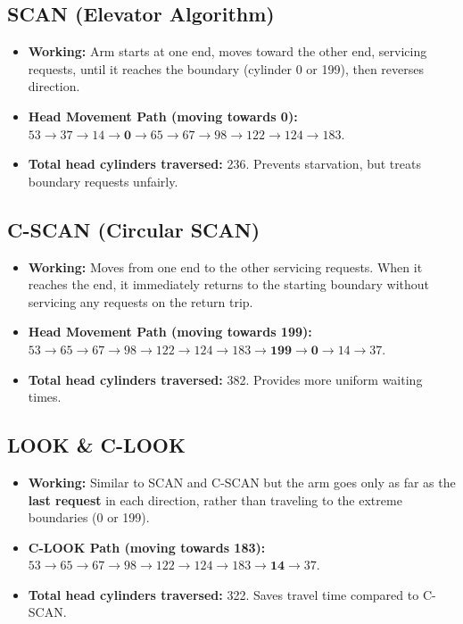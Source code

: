 \documentclass[12pt,a4paper]{article}
\begin{document}
\subsection{SCAN (Elevator Algorithm)}
\begin{itemize}[leftmargin=*, itemsep=3pt]
  \item \textbf{Working:} Arm starts at one end, moves toward the other end, servicing requests, until it reaches the boundary (cylinder 0 or 199), then reverses direction.
  \item \textbf{Head Movement Path (moving towards 0):} $53 \to 37 \to 14 \to \mathbf{0} \to 65 \to 67 \to 98 \to 122 \to 124 \to 183$.
  \item \textbf{Total head cylinders traversed:} 236. Prevents starvation, but treats boundary requests unfairly.
\end{itemize}

\subsection{C-SCAN (Circular SCAN)}
\begin{itemize}[leftmargin=*, itemsep=3pt]
  \item \textbf{Working:} Moves from one end to the other servicing requests. When it reaches the end, it immediately returns to the starting boundary without servicing any requests on the return trip.
  \item \textbf{Head Movement Path (moving towards 199):} $53 \to 65 \to 67 \to 98 \to 122 \to 124 \to 183 \to \mathbf{199} \to \mathbf{0} \to 14 \to 37$.
  \item \textbf{Total head cylinders traversed:} 382. Provides more uniform waiting times.
\end{itemize}

\subsection{LOOK \& C-LOOK}
\begin{itemize}[leftmargin=*, itemsep=3pt]
  \item \textbf{Working:} Similar to SCAN and C-SCAN but the arm goes only as far as the \textbf{last request} in each direction, rather than traveling to the extreme boundaries (0 or 199).
  \item \textbf{C-LOOK Path (moving towards 183):} $53 \to 65 \to 67 \to 98 \to 122 \to 124 \to 183 \to \mathbf{14} \to 37$.
  \item \textbf{Total head cylinders traversed:} 322. Saves travel time compared to C-SCAN.
\end{itemize}
\end{document}

